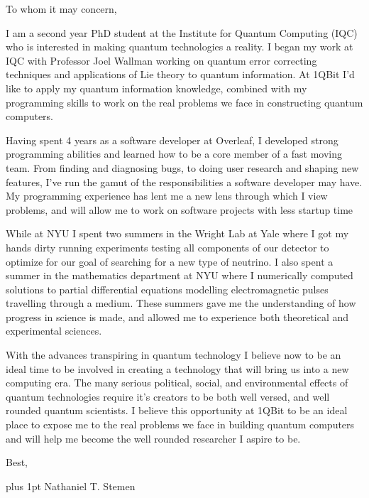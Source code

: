 \documentclass[12pt]{article}
\begin{document}
\noindent
To whom it may concern,

I am a second year PhD student at the Institute for Quantum Computing (IQC) who is interested in making quantum technologies a reality.
I began my work at IQC with Professor Joel Wallman working on quantum error correcting techniques and applications of Lie theory to quantum information.
At 1QBit I'd like to apply my quantum information knowledge, combined with my programming skills to work on the real problems we face in constructing quantum computers.

Having spent 4 years as a software developer at Overleaf, I developed strong programming abilities and learned how to be a core member of a fast moving team.
From finding and diagnosing bugs, to doing user research and shaping new features, I've run the gamut of the responsibilities a software developer may have.
My programming experience has lent me a new lens through which I view problems, and will allow me to work on software projects with less startup time

While at NYU I spent two summers in the Wright Lab at Yale where I got my hands dirty running experiments testing all components of our detector to optimize for our goal of searching for a new type of neutrino.
I also spent a summer in the mathematics department at NYU where I numerically computed solutions to partial differential equations modelling electromagnetic pulses travelling through a medium.
These summers gave me the understanding of how progress in science is made, and allowed me to experience both theoretical and experimental sciences.

With the advances transpiring in quantum technology I believe now to be an ideal time to be involved in creating a technology that will bring us into a new computing era.
The many serious political, social, and environmental effects of quantum technologies require it's creators to be both well versed, and well rounded quantum scientists.
I believe this opportunity at 1QBit to be an ideal place to expose me to the real problems we face in building quantum computers and will help me become the well rounded researcher I aspire to be.

\noindent
Best,

\parskip=0pt plus 1pt
Nathaniel T. Stemen
\end{document}

